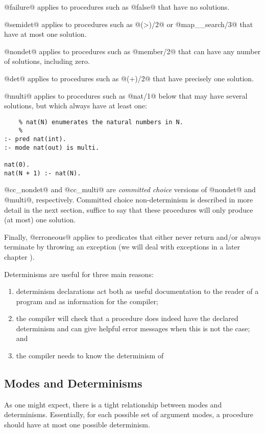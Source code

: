 @failure@ applies to procedures such as @false@ that have no
solutions.

@semidet@ applies to procedures such as @(>)/2@ or @map__search/3@
that have at most one solution.

@nondet@ applies to procedures such as @member/2@ that can have
any number of solutions, including zero.

@det@ applies to procedures such as @(+)/2@ that have precisely
one solution.

@multi@ applies to procedures such as @nat/1@ below that may have
several solutions, but which always have at least one:
\begin{verbatim}
    % nat(N) enumerates the natural numbers in N.
    %
:- pred nat(int).
:- mode nat(out) is multi.

nat(0).
nat(N + 1) :- nat(N).
\end{verbatim}
@cc_nondet@ and @cc_multi@ are \emph{committed choice} versions of
@nondet@ and @multi@, respectively.  Committed choice
non-determinism is described in more detail in the next
section, suffice to say that these procedures will only
produce (at most) one solution.

Finally, @erroneous@ applies to predicates that either never
return and/or always terminate by throwing an exception (we
will deal with exceptions in a later chapter \XXX{}).

Determinisms are useful for three main reasons:
\begin{enumerate}
\item determinism declarations act both as useful documentation
  to the reader of a program and as information for the
  compiler;
\item the compiler will check that a procedure does indeed have
  the declared determinism and can give helpful error messages
  when this is not the case; and
\item the compiler needs to know the determinism of
\end{enumerate}

\subsection{Modes and Determinisms}

As one might expect, there is a tight relationship between
modes and determinisms.  Essentially, for each possible
set of argument modes, a procedure should have at most one
possible determinism.


